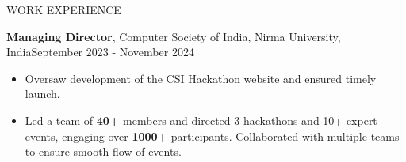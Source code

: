 \documentclass{resume} %
\begin{document}
\begin{rSection}{WORK EXPERIENCE}


\textbf{Managing Director}, Computer Society of India, Nirma University, India\hfill September 2023 - November 2024
\vspace{-0.5em}
 \begin{itemize}
    \itemsep -2pt {} 
     \item Oversaw development of the CSI Hackathon website and ensured timely launch.
     \vspace{-0.5em}
     \item Led a team of \textbf{40+} members and directed 3 hackathons and 10+ expert events, engaging over \textbf{1000+} participants. Collaborated with multiple teams to ensure smooth flow of events.
 \end{itemize}
 

\end{rSection}
\vspace{-0.75em}
\end{document}
